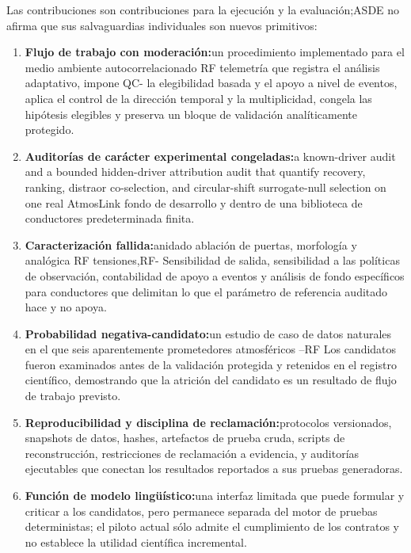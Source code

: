 \documentclass{ieeeaccess}
\providecommand{\tightlist}{\setlength{\itemsep}{0pt}\setlength{\parskip}{0pt}}
\begin{document}
Las contribuciones son contribuciones para la ejecución y la evaluación;ASDE no afirma que sus salvaguardias individuales son nuevos primitivos:

\begin{enumerate}
\def\labelenumi{\arabic{enumi}.}
\tightlist
\item
  \textbf{Flujo de trabajo con moderación:}un procedimiento implementado para el medio ambiente autocorrelacionado RF telemetría que registra el análisis adaptativo, impone QC- la elegibilidad basada y el apoyo a nivel de eventos, aplica el control de la dirección temporal y la multiplicidad, congela las hipótesis elegibles y preserva un bloque de validación analíticamente protegido.
\item
  \textbf{Auditorías de carácter experimental congeladas:}a known-driver audit and a bounded hidden-driver attribution audit that quantify recovery, ranking, distraor co-selection, and circular-shift surrogate-null selection on one real AtmosLink fondo de desarrollo y dentro de una biblioteca de conductores predeterminada finita.
\item
  \textbf{Caracterización fallida:}anidado ablación de puertas, morfología y analógica RF tensiones,RF- Sensibilidad de salida, sensibilidad a las políticas de observación, contabilidad de apoyo a eventos y análisis de fondo específicos para conductores que delimitan lo que el parámetro de referencia auditado hace y no apoya.
\item
  \textbf{Probabilidad negativa-candidato:}un estudio de caso de datos naturales en el que seis aparentemente prometedores atmosféricos --RF Los candidatos fueron examinados antes de la validación protegida y retenidos en el registro científico, demostrando que la atrición del candidato es un resultado de flujo de trabajo previsto.
\item
  \textbf{Reproducibilidad y disciplina de reclamación:}protocolos versionados, snapshots de datos, hashes, artefactos de prueba cruda, scripts de reconstrucción, restricciones de reclamación a evidencia, y auditorías ejecutables que conectan los resultados reportados a sus pruebas generadoras.
\item
  \textbf{Función de modelo lingüístico:}una interfaz limitada que puede formular y criticar a los candidatos, pero permanece separada del motor de pruebas deterministas; el piloto actual sólo admite el cumplimiento de los contratos y no establece la utilidad científica incremental.
\end{enumerate}
\end{document}
